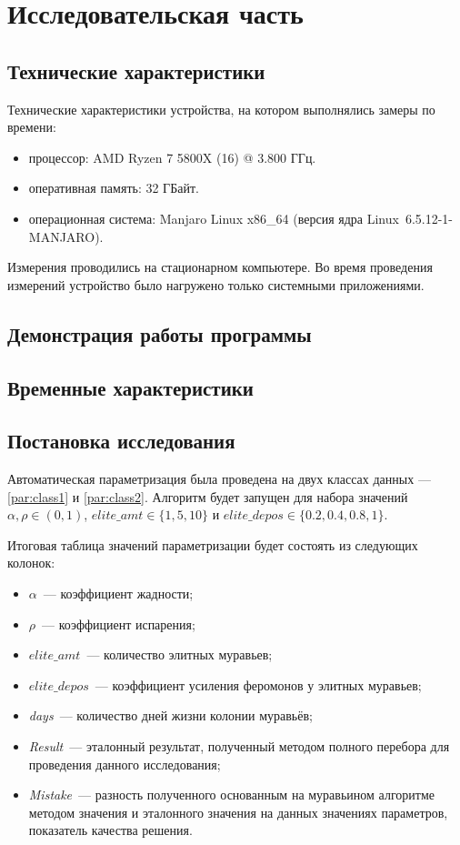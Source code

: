 \chapter{Исследовательская часть}

\section{Технические характеристики}

Технические характеристики устройства, на котором выполнялись замеры по времени:

\begin{itemize}
	\item процессор: AMD Ryzen 7 5800X (16) @ 3.800 ГГц.
	\item оперативная память: 32 ГБайт.
	\item операционная система: Manjaro Linux x86\_64 (версия ядра Linux~6.5.12-1-MANJARO).
\end{itemize}

Измерения проводились на стационарном компьютере.
Во время проведения измерений устройство было нагружено только системными приложениями.

\section{Демонстрация работы программы}

\section{Временные характеристики}

\section{Постановка исследования}

Автоматическая параметризация была проведена на двух классах данных --- \ref{par:class1} и \ref{par:class2}.
Алгоритм будет запущен для набора значений $\alpha, \rho \in (0, 1)$, $elite\_amt \in \{1, 5, 10\}$ и $elite\_depos \in \{0.2, 0.4, 0.8, 1\}$.

Итоговая таблица значений параметризации будет состоять из следующих колонок:
\begin{itemize}
	\item $\alpha$~--- коэффициент жадности;
	\item $\rho$~--- коэффициент испарения;
	\item $elite\_amt$~--- количество элитных муравьев;
	\item $elite\_depos$~--- коэффициент усиления феромонов у элитных муравьев;
	\item \textit{days}~--- количество дней жизни колонии муравьёв;
	\item \textit{Result}~--- эталонный результат, полученный методом полного перебора для проведения данного исследования;
	\item \textit{Mistake}~--- разность полученного основанным на муравьином алгоритме методом значения и эталонного значения на данных значениях параметров, показатель качества решения.
\end{itemize}

